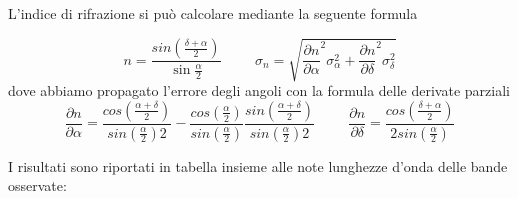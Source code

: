 \documentclass[a4paper]{article}
\theoremstyle{definition}
\begin{document}
  \begin{figure}[!htbp]
    	
	\end{figure}

\noindent L'indice di rifrazione si può calcolare mediante la seguente formula

\[n= \frac{sin(\frac{\delta + \alpha}{2})} {\sin \frac{\alpha}{2}}   \hspace{1cm}    \sigma_{n} = \sqrt{ \frac{\partial n}{\partial \alpha}^{2} \sigma_{\alpha}^{2} + \frac{\partial n}{\partial \delta}^{2} \sigma_{\delta}^{2}}\]
dove abbiamo propagato l'errore degli angoli con la formula delle derivate parziali
\[\frac{\partial n}{\partial \alpha} =  \frac{cos\left( \frac{\alpha+\delta }{2} \right)}{sin\left(\frac{\alpha}{2}\right)2} -  \frac{cos(\frac{\alpha}{2})}{sin(\frac{\alpha}{2})} \frac{sin( \frac{\alpha+\delta}{2} )}{sin(\frac{\alpha}{2})2}   \hspace{1cm}   \frac{\partial n}{\partial \delta}= \frac{cos(\frac{\delta+\alpha}{2})}{2 sin(\frac{\alpha}{2})}\]


\noindent I risultati sono riportati in tabella insieme alle note lunghezze d'onda delle bande osservate:

  \begin{figure}[!htbp]
    	
	\end{figure}
\end{document}
